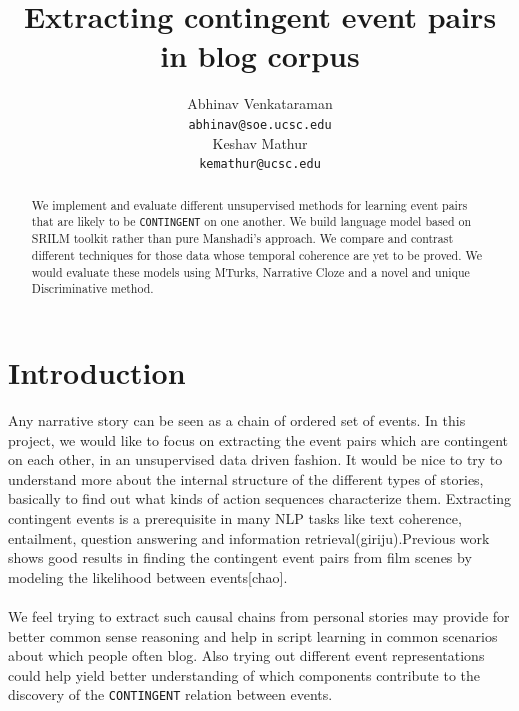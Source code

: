 \documentclass[11pt]{article}
\title{Extracting contingent event pairs in  blog corpus}
\author{Abhinav Venkataraman  \\
  {\tt abhinav@soe.ucsc.edu} \\\And
  Keshav Mathur \\
  {\tt kemathur@ucsc.edu} \\}
\date{}
\begin{document}
\maketitle
\begin{abstract}
We implement and evaluate different unsupervised methods for learning event pairs that are likely to be
\texttt{CONTINGENT} on one another\cite{film}. We build language model based on SRILM toolkit rather than pure Manshadi's approach. We compare and contrast different techniques for those data whose temporal coherence are yet to be proved. We would evaluate these models using MTurks, Narrative Cloze and a novel and unique Discriminative method.
\end{abstract}


\section{Introduction}
Any narrative story can be seen as a chain of ordered set of events. In this project, we would like to focus on extracting the event pairs which are contingent on each other, in an unsupervised data driven fashion. It would be nice to try to understand more about the internal structure of the different types of stories, basically to find out what kinds of action sequences characterize them. Extracting contingent events is a prerequisite in many NLP tasks like text coherence, entailment, question answering and information retrieval(giriju).Previous work shows good results in finding the contingent event pairs from film scenes by modeling the likelihood between events[chao]. \\
\medskip \\
We feel trying to extract such causal chains from personal stories may provide for better common sense reasoning and help in script learning in common scenarios about which people often blog. Also trying out different event representations could help yield better understanding of which components contribute to the discovery of the \texttt{CONTINGENT} relation between events. 
\end{document}
